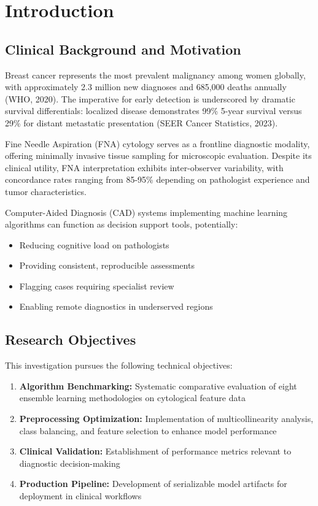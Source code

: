 \documentclass[11pt,a4paper]{article}
\begin{document}
\section{Introduction}

\subsection{Clinical Background and Motivation}

Breast cancer represents the most prevalent malignancy among women globally, with approximately 2.3 million new diagnoses and 685,000 deaths annually (WHO, 2020). The imperative for early detection is underscored by dramatic survival differentials: localized disease demonstrates 99\% 5-year survival versus 29\% for distant metastatic presentation (SEER Cancer Statistics, 2023).

Fine Needle Aspiration (FNA) cytology serves as a frontline diagnostic modality, offering minimally invasive tissue sampling for microscopic evaluation. Despite its clinical utility, FNA interpretation exhibits inter-observer variability, with concordance rates ranging from 85-95\% depending on pathologist experience and tumor characteristics.

Computer-Aided Diagnosis (CAD) systems implementing machine learning algorithms can function as decision support tools, potentially:
\begin{itemize}
    \item Reducing cognitive load on pathologists
    \item Providing consistent, reproducible assessments
    \item Flagging cases requiring specialist review
    \item Enabling remote diagnostics in underserved regions
\end{itemize}

\subsection{Research Objectives}

This investigation pursues the following technical objectives:

\begin{enumerate}
    \item \textbf{Algorithm Benchmarking:} Systematic comparative evaluation of eight ensemble learning methodologies on cytological feature data
    \item \textbf{Preprocessing Optimization:} Implementation of multicollinearity analysis, class balancing, and feature selection to enhance model performance
    \item \textbf{Clinical Validation:} Establishment of performance metrics relevant to diagnostic decision-making
    \item \textbf{Production Pipeline:} Development of serializable model artifacts for deployment in clinical workflows
\end{enumerate}
\end{document}
